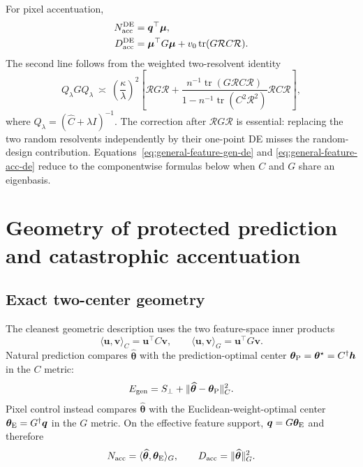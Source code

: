 \documentclass[11pt]{article}
\newcommand{\tr}{\operatorname{tr}}
\newcommand{\that}{\widehat{\bm\theta}}
\newcommand{\tstar}{\bm\theta^{\star}}
\begin{document}
For pixel accentuation,
\begin{align}
  N_{\rm acc}^{\rm DE}
    &=\bm q^{\top}\bm\mu,\\
  D_{\rm acc}^{\rm DE}
    &=\bm\mu^{\top}G\bm\mu
      +v_0\tr(G\mathcal R C\mathcal R).
  \label{eq:general-feature-acc-de}
\end{align}
The second line follows from the weighted two-resolvent identity
\begin{equation}
  Q_{\lambda}GQ_{\lambda}\ \asymp\
  \left(\frac{\kappa}{\lambda}\right)^2
  \left[
    \mathcal R G\mathcal R
    +\frac{n^{-1}\tr(G\mathcal R C\mathcal R)}
           {1-n^{-1}\tr(C^2\mathcal R^2)}
      \mathcal R C\mathcal R
  \right],
  \label{eq:weighted-two-resolvent}
\end{equation}
where $Q_{\lambda}=(\widehat C+\lambda I)^{-1}$.  The correction after
$\mathcal R G\mathcal R$ is essential: replacing the two random resolvents
independently by their one-point DE misses the random-design contribution.
Equations~\eqref{eq:general-feature-gen-de} and
\eqref{eq:general-feature-acc-de} reduce to the componentwise formulas below
when $C$ and $G$ share an eigenbasis.

\section{Geometry of protected prediction and catastrophic accentuation}
\label{sec:protected-prediction-bad-control}

\subsection{Exact two-center geometry}

The cleanest geometric description uses the two feature-space inner products
\begin{equation}
  \langle\bm u,\bm v\rangle_C=\bm u^{\top}C\bm v,
  \qquad
  \langle\bm u,\bm v\rangle_G=\bm u^{\top}G\bm v.
\end{equation}
Natural prediction compares $\that$ with the prediction-optimal center
$\bm\theta_{\rm P}=\tstar=C^{\dagger}\bm h$ in the $C$ metric:
\begin{equation}
  E_{\rm gen}=S_{\perp}
  +\lVert\that-\bm\theta_{\rm P}\rVert_C^2.
  \label{eq:prediction-ellipsoid}
\end{equation}
Pixel control instead compares $\that$ with the Euclidean-weight-optimal
center $\bm\theta_{\rm E}=G^{\dagger}\bm q$ in the $G$ metric.  On the
effective feature support, $\bm q=G\bm\theta_{\rm E}$ and therefore
\begin{equation}
  N_{\rm acc}=\langle\that,\bm\theta_{\rm E}\rangle_G,
  \qquad
  D_{\rm acc}=\lVert\that\rVert_G^2.
\end{equation}
\end{document}
